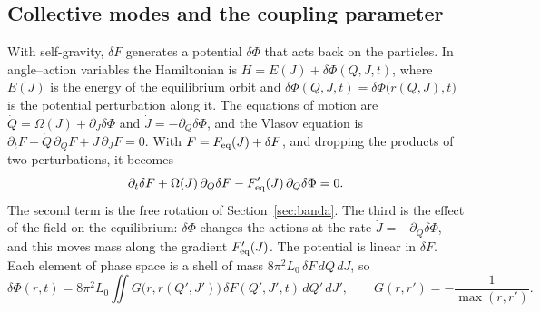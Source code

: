 \documentclass[11pt,a4paper]{article}
\begin{document}
\subsection{Collective modes and the coupling parameter}
\label{sec:modo}
\label{sec:eta}

With self-gravity, $\delta F$ generates a potential $\delta\Phi$ that acts back on the
particles. In angle--action variables the Hamiltonian is $H=E(J)+\delta\Phi(Q,J,t)$, where
$E(J)$ is the energy of the equilibrium orbit and $\delta\Phi(Q,J,t)=\delta\Phi\big(r(Q,J),t\big)$
is the potential perturbation along it. The equations of motion are
$\dot Q=\Omega(J)+\partial_J\delta\Phi$ and $\dot J=-\partial_Q\delta\Phi$, and the Vlasov equation is
$\partial_tF+\dot Q\,\partial_QF+\dot J\,\partial_JF=0$. With $F=F_{\rm eq}(J)+\delta F$, and
dropping the products of two perturbations, it becomes
\[
  \partial_t\delta F+\Omega(J)\,\partial_Q\delta F-F_{\rm eq}'(J)\,\partial_Q\delta\Phi=0 .
\]
The second term is the free rotation of Section~\ref{sec:banda}. The third is the effect of
the field on the equilibrium: $\delta\Phi$ changes the actions at the rate
$\dot J=-\partial_Q\delta\Phi$, and this moves mass along the gradient $F_{\rm eq}'(J)$. The
potential is linear in $\delta F$. Each element of phase space is a shell of mass
$8\pi^2L_0\,\delta F\,dQ\,dJ$, so
\[
  \delta\Phi(r,t)=8\pi^2L_0\iint G\big(r,r(Q',J')\big)\,\delta F(Q',J',t)\,dQ'\,dJ',\qquad
  G(r,r')=-\frac1{\max(r,r')}.
\]
\end{document}
